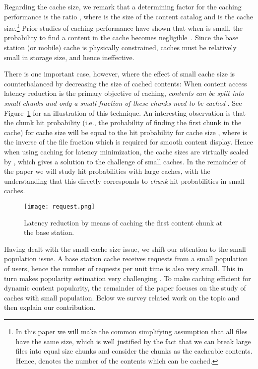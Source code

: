 \documentclass[10pt, conference, letterpaper]{IEEEtran}
\newcommand{\spyros}[1]{{#1}}
\begin{document}
Regarding the cache size, we remark that 
a determining factor for the caching performance is the ratio , where  is the size of the content catalog and  is the cache size.\footnote{In this paper we will make the common simplifying assumption that all files have the same size\spyros {, which is well justified by the fact that we can break large files into equal size chunks and consider the chunks as the cacheable contents}. Hence,  denotes the number of the contents which can be cached.} 
Prior studies of caching performance have shown that when  is small, the probability to find a content in the cache becomes negligible~\cite{Roberts13}.
Since the base station (or mobile) cache is physically constrained, caches must be relatively small in storage size, and hence ineffective. 

 
\spyros {There is one important case, however, where the effect of small cache size is counterbalanced by decreasing the size of cached contents: When content access latency reduction is the primary objective of caching, \emph{contents can be split into small chunks and only a small fraction of these chunks need to be cached}} \cite{Sen99}. 
See Figure~\ref{fig:request} for an illustration of this technique.
An interesting observation is that the chunk hit probability (i.e., the probability of finding the first chunk in the cache) for cache size   will be equal to the hit probability for cache size , where  is the inverse of the file fraction which is required for smooth content display. Hence when using caching for latency minimization, the cache sizes are virtually scaled by , which gives a solution to the challenge of small caches. In the remainder of the paper we will study  hit probabilities with large caches, with the understanding that this directly corresponds to  \emph{chunk} hit probabilities in small caches.

\begin{figure}[t]
      \centering
            \texttt{[image: request.png]}
						\vspace{-0.15in} 
      \caption{Latency reduction by means of caching the first content chunk at the base station.}\vspace{-0.4in}
			\label{fig:request}
\end{figure}


Having dealt with the small cache size issue, we shift our attention to the small population issue.
A base station cache receives requests from a small population of users, hence the number of requests per unit time is also very small. This in turn makes popularity estimation very challenging \cite{5Gcaching}. 
To make caching efficient for dynamic content popularity, 
the remainder of the paper 
focuses on the study of  
caches with small population.
Below we survey related work on the topic and then explain our contribution.
\end{document}
